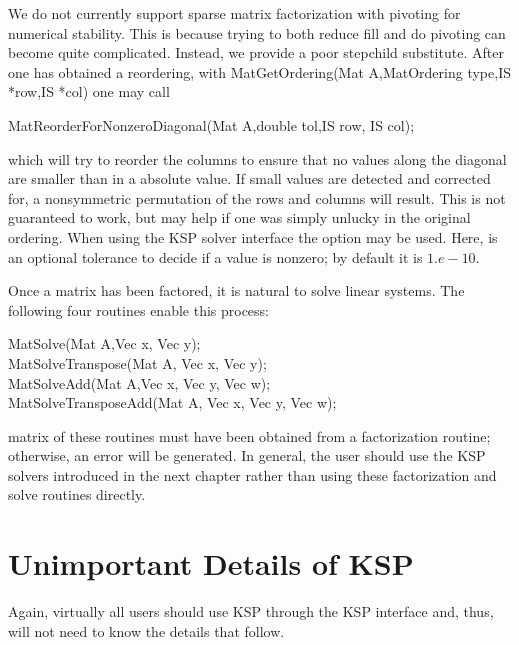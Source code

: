 {{{We do not currently support sparse matrix factorization with pivoting
for numerical stability. This is because trying to both reduce fill
and do pivoting can become quite complicated. Instead, we provide a
poor stepchild substitute. After one has obtained a reordering, with
MatGetOrdering(Mat A,MatOrdering type,IS *row,IS *col) one
may call
\begin{tabbing}
  MatReorderForNonzeroDiagonal(Mat A,double tol,IS row, IS col);
\end{tabbing}
which will try to reorder the columns to ensure that no values along
the diagonal are smaller than  in a absolute value. If small
values are detected and corrected for, a nonsymmetric
permutation of the rows and columns will result. This is not guaranteed to work,
but may help if one was simply unlucky in the original ordering.
When using the KSP solver interface
the option  
may be used.  Here, 
is an optional tolerance to decide if a value is nonzero; by default it
is $ 1.e-10.$

Once a matrix has been factored, it is natural to solve linear systems.
The following four routines enable this process: 
\begin{tabbing}
  MatSolve(Mat A,Vec x, Vec y);\\
  MatSolveTranspose(Mat A, Vec x, Vec y);\\
  MatSolveAdd(Mat A,Vec x, Vec y, Vec w);\\
  MatSolveTransposeAdd(Mat A, Vec x, Vec y, Vec w);
\end{tabbing}
matrix
 of these routines must have been obtained from a
factorization routine; otherwise, an error will be generated.
In general, the user should use the KSP solvers introduced in the
next chapter rather than using these factorization and solve routines
directly.

\section{Unimportant Details of KSP}

Again, virtually all users should use KSP through the KSP interface
and, thus, will not need to know the details that follow.

}}}
